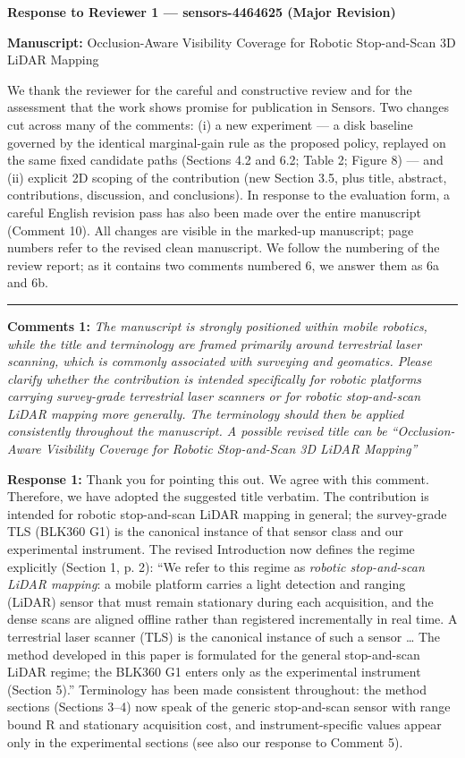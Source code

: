 \documentclass[11pt]{article}
\begin{document}
\begin{center}\LARGE\bfseries Response to Reviewer 1 — sensors-4464625 (Major Revision)\end{center}

\textbf{Manuscript:} Occlusion-Aware Visibility Coverage for Robotic Stop-and-Scan 3D LiDAR Mapping

We thank the reviewer for the careful and constructive review and for the assessment that the work shows promise for publication in Sensors. Two changes cut across many of the comments: (i) a new experiment — a disk baseline governed by the identical marginal-gain rule as the proposed policy, replayed on the same fixed candidate paths (Sections 4.2 and 6.2; Table 2; Figure 8) — and (ii) explicit 2D scoping of the contribution (new Section 3.5, plus title, abstract, contributions, discussion, and conclusions). In response to the evaluation form, a careful English revision pass has also been made over the entire manuscript (Comment 10). All changes are visible in the marked-up manuscript; page numbers refer to the revised clean manuscript. We follow the numbering of the review report; as it contains two comments numbered 6, we answer them as 6a and 6b.

\medskip\hrule\medskip

\textbf{Comments 1:} \emph{The manuscript is strongly positioned within mobile robotics, while the title and terminology are framed primarily around terrestrial laser scanning, which is commonly associated with surveying and geomatics. Please clarify whether the contribution is intended specifically for robotic platforms carrying survey-grade terrestrial laser scanners or for robotic stop-and-scan LiDAR mapping more generally. The terminology should then be applied consistently throughout the manuscript. A possible revised title can be “Occlusion-Aware Visibility Coverage for Robotic Stop-and-Scan 3D LiDAR Mapping”}

\textbf{Response 1:} Thank you for pointing this out. We agree with this comment. Therefore, we have adopted the suggested title verbatim. The contribution is intended for robotic stop-and-scan LiDAR mapping in general; the survey-grade TLS (BLK360 G1) is the canonical instance of that sensor class and our experimental instrument. The revised Introduction now defines the regime explicitly (Section 1, p. 2): “We refer to this regime as \emph{robotic stop-and-scan LiDAR mapping}: a mobile platform carries a light detection and ranging (LiDAR) sensor that must remain stationary during each acquisition, and the dense scans are aligned offline rather than registered incrementally in real time. A terrestrial laser scanner (TLS) is the canonical instance of such a sensor … The method developed in this paper is formulated for the general stop-and-scan LiDAR regime; the BLK360 G1 enters only as the experimental instrument (Section 5).” Terminology has been made consistent throughout: the method sections (Sections 3–4) now speak of the generic stop-and-scan sensor with range bound R and stationary acquisition cost, and instrument-specific values appear only in the experimental sections (see also our response to Comment 5).
\end{document}
